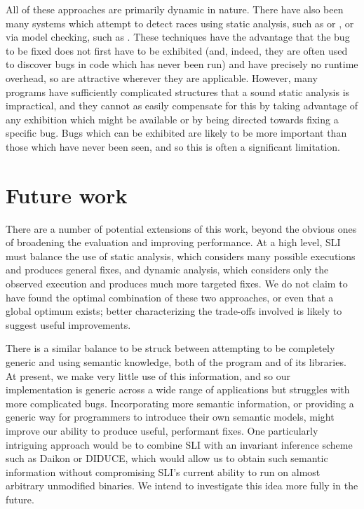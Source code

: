 \documentclass[10pt,letter,twocolumn]{sigplanconf}
\newcommand{\editorial}[1]{}
\begin{document}
All of these approaches are primarily dynamic in nature.  There have
also been many systems which attempt to detect races using static
analysis, such as \cite{Pratikakis2006} or \cite{Engler2003}, or via
model checking, such as \cite{Elmas06preciserace}.  These techniques
have the advantage that the bug to be fixed does not first have to be
exhibited (and, indeed, they are often used to discover bugs in code
which has never been run) and have precisely no runtime overhead, so
are attractive wherever they are applicable.  However, many programs
have sufficiently complicated structures that a sound static analysis
is impractical, and they cannot as easily compensate for this by
taking advantage of any exhibition which might be available or by
being directed towards fixing a specific bug.  Bugs which can be
exhibited are likely to be more important than those which have never
been seen, and so this is often a significant
limitation. \editorial{...}

\section{Future work}

There are a number of potential extensions of this work, beyond the
obvious ones of broadening the evaluation and improving performance.
At a high level, SLI must balance the use of static analysis, which
considers many possible executions and produces general fixes, and
dynamic analysis, which considers only the observed execution and
produces much more targeted fixes.  We do not claim to have found the
optimal combination of these two approaches, or even that a global
optimum exists; better characterizing the trade-offs involved is
likely to suggest useful improvements.

There is a similar balance to be struck between attempting to be
completely generic and using semantic knowledge, both of the program
and of its libraries.  At present, we make very little use of this
information, and so our implementation is generic across a wide range
of applications but struggles with more complicated bugs.
Incorporating more semantic information, or providing a generic way
for programmers to introduce their own semantic models, might improve
our ability to produce useful, performant fixes.  One particularly
intriguing approach would be to combine SLI with an invariant
inference scheme such as Daikon\cite{Ernst2007} or
DIDUCE\cite{Hangal2002}, which would allow us to obtain such semantic
information without compromising SLI's current ability to run on
almost arbitrary unmodified binaries.  We intend to investigate this
idea more fully in the future.
\end{document}
